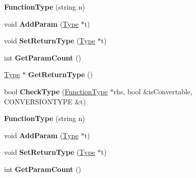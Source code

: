 \begin{DoxyCompactItemize}
\item 
\hypertarget{classFunctionType_a924981ea6fc18a7a9ed4cb5c94a136d6}{{\bfseries Function\-Type} (string n)}\label{classFunctionType_a924981ea6fc18a7a9ed4cb5c94a136d6}

\item 
\hypertarget{classFunctionType_a9259c94250b6cb903c6013bc10a0b7bc}{void {\bfseries Add\-Param} (\hyperlink{classType}{Type} $\ast$t)}\label{classFunctionType_a9259c94250b6cb903c6013bc10a0b7bc}

\item 
\hypertarget{classFunctionType_a1462775c5732b70b07c689ab7088814d}{void {\bfseries Set\-Return\-Type} (\hyperlink{classType}{Type} $\ast$t)}\label{classFunctionType_a1462775c5732b70b07c689ab7088814d}

\item 
\hypertarget{classFunctionType_a8b6fed7ff4d79b5db3d39cd042326090}{int {\bfseries Get\-Param\-Count} ()}\label{classFunctionType_a8b6fed7ff4d79b5db3d39cd042326090}

\item 
\hypertarget{classFunctionType_a601e763553086c0d7a4c2de97d6de2bc}{\hyperlink{classType}{Type} $\ast$ {\bfseries Get\-Return\-Type} ()}\label{classFunctionType_a601e763553086c0d7a4c2de97d6de2bc}

\item 
\hypertarget{classFunctionType_a150840d05c02a26ca776aad22e0deed1}{bool {\bfseries Check\-Type} (\hyperlink{classFunctionType}{Function\-Type} $\ast$rhs, bool \&is\-Convertable, C\-O\-N\-V\-E\-R\-S\-I\-O\-N\-T\-Y\-P\-E \&t)}\label{classFunctionType_a150840d05c02a26ca776aad22e0deed1}

\item 
\hypertarget{classFunctionType_a924981ea6fc18a7a9ed4cb5c94a136d6}{{\bfseries Function\-Type} (string n)}\label{classFunctionType_a924981ea6fc18a7a9ed4cb5c94a136d6}

\item 
\hypertarget{classFunctionType_a9259c94250b6cb903c6013bc10a0b7bc}{void {\bfseries Add\-Param} (\hyperlink{classType}{Type} $\ast$t)}\label{classFunctionType_a9259c94250b6cb903c6013bc10a0b7bc}

\item 
\hypertarget{classFunctionType_a1462775c5732b70b07c689ab7088814d}{void {\bfseries Set\-Return\-Type} (\hyperlink{classType}{Type} $\ast$t)}\label{classFunctionType_a1462775c5732b70b07c689ab7088814d}

\item 
\hypertarget{classFunctionType_a8b6fed7ff4d79b5db3d39cd042326090}{int {\bfseries Get\-Param\-Count} ()}\label{classFunctionType_a8b6fed7ff4d79b5db3d39cd042326090}


\end{DoxyCompactItemize}
